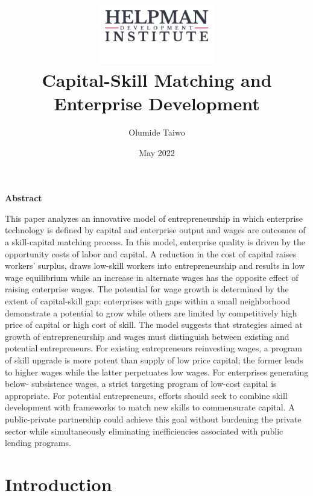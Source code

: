 \documentclass[
  a4paper,
  DIV=11,
  numbers=noendperiod]{scrartcl}
\title{\includegraphics[width=2in,height=\textheight]{resources/hdi_logo.png}\\
Capital-Skill Matching and Enterprise Development}
\author{Olumide Taiwo}
\date{May 2022}
\renewcommand*\contentsname{Table of contents}
\newcommand\contentsname{Table of contents}
\begin{document}
\maketitle
\ifdefined\Shaded\renewenvironment{Shaded}{\begin{tcolorbox}[interior hidden, boxrule=0pt, breakable, borderline west={3pt}{0pt}{shadecolor}, frame hidden, sharp corners, enhanced]}{\end{tcolorbox}}\fi

\renewcommand*\contentsname{Table of Contents}
{
\hypersetup{linkcolor=blue}
\setcounter{tocdepth}{2}
\tableofcontents
}
\newpage{}

\textbf{Abstract}

This paper analyzes an innovative model of entrepreneurship in which
enterprise technology is defined by capital and enterprise output and
wages are outcomes of a skill-capital matching process. In this model,
enterprise quality is driven by the opportunity costs of labor and
capital. A reduction in the cost of capital raises workers' surplus,
draws low-skill workers into entrepreneurship and results in low wage
equilibrium while an increase in alternate wages has the opposite effect
of raising enterprise wages. The potential for wage growth is determined
by the extent of capital-skill gap: enterprises with gaps within a small
neighborhood demonstrate a potential to grow while others are limited by
competitively high price of capital or high cost of skill. The model
suggests that strategies aimed at growth of entrepreneurship and wages
must distinguish between existing and potential entrepreneurs. For
existing entrepreneurs reinvesting wages, a program of skill upgrade is
more potent than supply of low price capital; the former leads to higher
wages while the latter perpetuates low wages. For enterprises generating
below- subsistence wages, a strict targeting program of low-cost capital
is appropriate. For potential entrepreneurs, efforts should seek to
combine skill development with frameworks to match new skills to
commensurate capital. A public-private partnership could achieve this
goal without burdening the private sector while simultaneously
eliminating inefficiencies associated with public lending programs.

\newpage{}

\hypertarget{introduction}{%
\section{Introduction}\label{introduction}}
\end{document}
